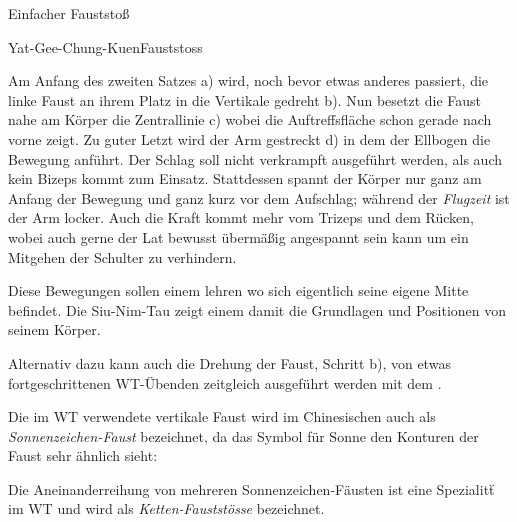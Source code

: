 \begin{WTSatz}{Einfacher Fauststo{\ss}}%
	
	
	\begin{WTSatzTeil}{Yat-Gee-Chung-Kuen}{Fauststoss}
		
		Am Anfang des zweiten Satzes a) wird, noch bevor etwas anderes passiert, die linke Faust an ihrem Platz in die Vertikale gedreht b). Nun besetzt die Faust nahe am K\"orper die Zentrallinie c) wobei die Auftreffsfl\"ache schon gerade nach vorne zeigt. Zu guter Letzt wird der Arm gestreckt d) in dem der Ellbogen die Bewegung anf\"uhrt. Der Schlag soll nicht verkrampft ausgef\"uhrt werden, als auch kein Bizeps kommt zum Einsatz. Stattdessen spannt der K\"orper nur ganz am Anfang der Bewegung und ganz kurz vor dem Aufschlag; w\"ahrend der \textit{Flugzeit} ist der Arm locker. Auch die Kraft kommt mehr vom Trizeps und dem R\"ucken, wobei auch gerne der Lat bewusst \"uberm\"a{\ss}ig angespannt sein kann um ein Mitgehen der Schulter zu verhindern.
		
		Diese Bewegungen sollen einem lehren wo sich eigentlich seine eigene Mitte befindet. Die Siu-Nim-Tau zeigt einem damit die Grundlagen und Positionen von seinem K\"orper.
		
		Alternativ dazu kann auch die Drehung der Faust, Schritt b), von etwas fortgeschrittenen WT-\"Ubenden zeitgleich ausgef\"uhrt werden mit dem .
		
	\begin{WTCommonBegriff}
		Die im WT verwendete vertikale Faust wird im Chinesischen auch als \textit{Sonnenzeichen-Faust} bezeichnet, da das Symbol f\"ur Sonne den Konturen der Faust sehr \"ahnlich sieht:
		
		\flushleft
		
		Die Aneinanderreihung von mehreren Sonnenzeichen-F\"austen ist eine Spezialit\"t im WT und wird als \textit{Ketten-Faustst\"osse} bezeichnet.
	\end{WTCommonBegriff}
			
		
		

\end{WTSatzTeil}
\end{WTSatz}

